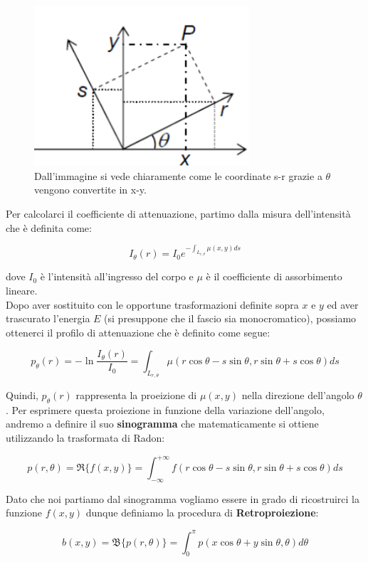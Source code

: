 \begin{figure}[H]
    \centering
    \includegraphics[width=8cm, keepaspectratio]{capitoli/immagini/imgs/gantryref.png}
    \caption{Dall'immagine si vede chiaramente come le coordinate s-r grazie a $\theta$ vengono convertite in x-y.}
\end{figure}

Per calcolarci il coefficiente di attenuazione, partimo dalla misura dell'intensità
che è definita come:

$$
    I_\theta(r) = I_0 e^{-\int_{L_{r,\theta}} \mu(x,y) ds}
$$

dove $I_0$ è l'intensità all'ingresso del corpo e $\mu$ è il coefficiente di assorbimento lineare.\\

Dopo aver sostituito con le opportune trasformazioni definite sopra $x$ e $y$ ed aver
trascurato l'energia $E$ (si presuppone che il fascio sia monocromatico), possiamo
ottenerci il profilo di attenuazione che è definito come segue:

$$
    p_\theta(r) = -\ln \frac{I_\theta(r)}{I_0} = \int_{L_{r, \theta}} \mu(r \cos \theta - s \sin \theta, r \sin \theta + s \cos \theta) ds
$$

Quindi, $p_\theta(r)$ rappresenta la proeizione di $\mu(x,y)$ nella direzione
dell'angolo $\theta$. Per esprimere questa proiezione in funzione della variazione
dell'angolo, andremo a definire il suo \textbf{sinogramma} che matematicamente si
ottiene utilizzando la trasformata di Radon:

$$
    p(r, \theta) = \Re \{ f(x,y) \} = \int_{- \infty}^{+ \infty} f(r \cos \theta - s \sin \theta, r \sin \theta + s \cos \theta) ds
$$

Dato che noi partiamo dal sinogramma vogliamo essere in grado di ricostruirci la
funzione $f(x,y)$ dunque definiamo la procedura di \textbf{Retroproiezione}:

$$
    b(x,y) = \mathfrak{B} \{p(r, \theta)\} = \int_{0}^{\pi} p(x \cos \theta + y \sin \theta, \theta) d\theta
$$

